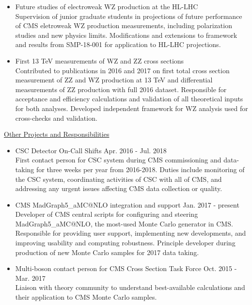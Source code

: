 \documentclass[10pt]{res} %
\begin{document}
\begin{resume}
\begin{itemize}
  \item{Future studies of electroweak WZ production at the HL-LHC} \\
    Supervision of junior graduate students in projections of future performance 
    of CMS eletroweak WZ production measurements, including polarization
    studies and new physics limits. Modifications and extensions to framework and results
    from SMP-18-001 for application to HL-LHC projections.

  \item{First 13 TeV measurements of WZ and ZZ cross sections} \\
    Contributed to publications in 2016 and 2017 on first total cross section measurement 
    of ZZ and WZ production at 13 TeV and differential measurements of ZZ production with full 2016 dataset. 
    Responsible for acceptance
    and efficiency calculations and validation of all theoretical inputs for both analyses. 
    Developed independent framework for WZ analysis used for cross-checks and validation.

\end{itemize}

\underline{Other Projects and Responsibilities}
\vspace{2mm}
\begin{itemize}
  \item CSC Detector On-Call Shifts \hfill{Apr. 2016 - Jul. 2018} \\
    First contact person for CSC system during CMS commissioning and data-taking for three weeks per year
    from 2016-2018. Duties include monitoring of the CSC system, coordinating activities of CSC with all of CMS, 
    and addressing any urgent issues affecting CMS data collection or quality.

  \item CMS MadGraph5\_aMC@NLO integration and support \hfill{Jan. 2017 - present} \\
    Developer of CMS central scripts
    for configuring and steering MadGraph5\_aMC@NLO, the most-used Monte Carlo generator in CMS. Responsible for 
    providing user support, implementing new developments, 
    and improving usability and computing robustness. Principle developer during production
    of new Monte Carlo samples for 2017 data taking.

  \item Multi-boson contact person for CMS Cross Section Task Force \hfill{Oct. 2015 - Mar. 2017} \\
    Liaison with theory community to understand best-available calculations and 
    their application to CMS Monte Carlo samples. 


\end{itemize}
\end{resume}
\end{document}
